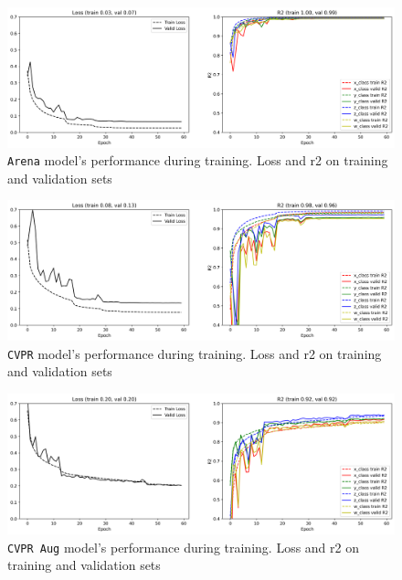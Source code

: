 \begin{figure}[H]
	\centering
	\includegraphics[width=1 \textwidth]{"contents/images/06-training-arena"}
	\caption[\texttt{Arena} model's performance during training. Loss and \gls{r2} on training and validation sets]{\texttt{Arena} model's performance during training. Loss and \gls{r2} on training and validation sets}
	\label{fig:training-metrics-arena}
\end{figure}

\begin{figure}[H]
	\centering
	\includegraphics[width=1 \textwidth]{"contents/images/06-training-CVPR"}
	\caption[\texttt{CVPR} model's performance during training. Loss and \gls{r2} on training and validation sets]{\texttt{CVPR} model's performance during training. Loss and \gls{r2} on training and validation sets}
	\label{fig:training-metrics-cvpr}
\end{figure}

\begin{figure}[H]
	\centering
	\includegraphics[width=1 \textwidth]{"contents/images/06-training-CVPRaug"}
	\caption[\texttt{CVPR Aug} model's performance during training. Loss and \gls{r2} on training and validation sets]{\texttt{CVPR Aug} model's performance during training. Loss and \gls{r2} on training and validation sets}
	\label{fig:training-metrics-cvpraug}
\end{figure}





